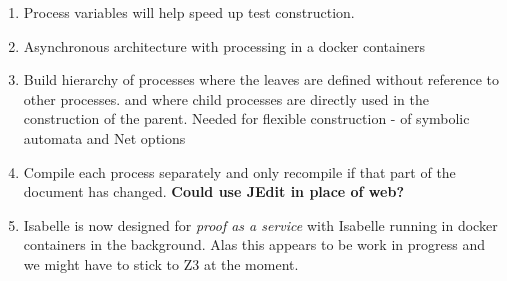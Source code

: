 \documentclass[]{article}
\begin{document}
\begin{enumerate}
\item Process variables will help speed up test construction.
\item Asynchronous architecture with  processing  in a docker containers
\item {\sf Build hierarchy of processes }   where the leaves are defined without reference to other processes. and where child processes are directly used in the construction of the parent.
 Needed for flexible construction - of  symbolic automata and Net options
\item Compile each process separately  and only recompile if that part of the document has changed. {\bf Could use JEdit  in place of web?}

\item  Isabelle  is now designed for \emph{proof as a service}  with Isabelle running in docker containers in the background.  Alas this appears to be work in progress and we might have to stick to Z3 at the moment.
\end{enumerate}
\end{document}

